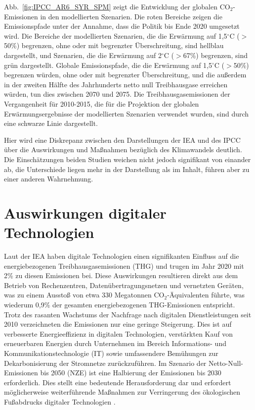\documentclass{article}
\begin{document}
Abb.~\ref{fig:IPCC_AR6_SYR_SPM} zeigt  die Entwicklung der globalen  CO$_2$-Emissionen in den modellierten Szenarien.  Die roten Bereiche zeigen die Emissionspfade unter der Annahme, dass die Politik bis Ende 2020 umgesetzt wird. Die Bereiche der modellierten Szenarien, die die Erwärmung auf 1,5$^\circ$C ($>$50\%) begrenzen, ohne oder mit begrenzter Überschreitung, sind hellblau dargestellt, und Szenarien, die die Erwärmung auf 2$^\circ$C ($>$67\%) begrenzen, sind grün dargestellt. Globale Emissionspfade, die die Erwärmung auf 1,5$^\circ$C ($>$50\%) begrenzen würden, ohne oder mit begrenzter Überschreitung, und die außerdem in der zweiten Hälfte des Jahrhunderts netto null Treibhausgase erreichen würden, tun dies zwischen 2070 und 2075. Die Treibhausgasemissionen der Vergangenheit für 2010-2015, die für die Projektion der globalen Erwärmungsergebnisse der modellierten Szenarien verwendet wurden, sind durch eine
schwarze Linie dargestellt.


Hier wird eine Diskrepanz zwischen den Darstellungen der IEA und des IPCC über die Auswirkungen und Maßnahmen bezüglich des Klimawandels deutlich. Die Einschätzungen beiden Studien weichen nicht jedoch signifikant von einander  ab,  die Unterschiede liegen  mehr in der Darstellung als im Inhalt, führen aber zu einer anderen Wahrnehmung.


\section{Auswirkungen digitaler Technologien}
Laut der IEA haben digitale Technologien einen signifikanten Einfluss auf die energiebezogenen Treibhausgasemissionen (THG) und trugen im Jahr 2020 mit 2\% zu diesen Emissionen bei. Diese Auswirkungen resultieren direkt aus dem Betrieb von Rechenzentren, Datenübertragungsnetzen und vernetzten Geräten, was zu einem Ausstoß von etwa 330 Megatonnen CO$_2$-Äquivalenten führte, was wiederum 0,9\% der gesamten energiebezogenen THG-Emissionen entspricht.
Trotz des rasanten Wachstums der Nachfrage nach digitalen Dienstleistungen seit 2010 verzeichneten die Emissionen nur eine geringe Steigerung. Dies ist auf verbesserte Energieeffizienz in digitalen Technologien, verstärkten Kauf von erneuerbaren Energien durch Unternehmen im Bereich Informations- und Kommunikationstechnologie (IT) sowie umfassendere Bemühungen zur Dekarbonisierung der Stromnetze zurückzuführen.
Im Szenario der Netto-Null-Emissionen bis 2050 (NZE) ist eine Halbierung der Emissionen bis 2030 erforderlich. Dies stellt eine bedeutende Herausforderung dar und erfordert möglicherweise weiterführende Maßnahmen zur Verringerung des ökologischen Fußabdrucks digitaler Technologien \cite{iea_digitalisation}.
\end{document}
